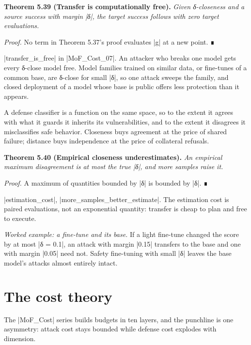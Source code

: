 \documentclass{memoir}
\begin{document}
\textbf{Theorem 5.39 (Transfer is computationally free).} \emph{Given δ-closeness and a source
success with margin \LeanVerb|δ|, the target success follows with zero target
evaluations.}

\emph{Proof.} No term in Theorem 5.37's proof evaluates \LeanVerb|g| at a new point. ∎

\LeanVerb|transfer_is_free| in \LeanVerb|MoF_Cost_07|. An attacker who breaks one model gets every
δ-close model free. Model families trained on similar data, or fine-tunes of a
common base, are δ-close for small \LeanVerb|δ|, so one attack sweeps the family, and
closed deployment of a model whose base is public offers less protection than it
appears.

A defense classifier is a function on the same space, so to the extent it agrees
with what it guards it inherits its vulnerabilities, and to the extent it
disagrees it misclassifies safe behavior. Closeness buys agreement at the price
of shared failure; distance buys independence at the price of collateral
refusals.

\textbf{Theorem 5.40 (Empirical closeness underestimates).} \emph{An empirical maximum disagreement
is at most the true \LeanVerb|δ|, and more samples raise it.}

\emph{Proof.} A maximum of quantities bounded by \LeanVerb|δ| is bounded by \LeanVerb|δ|. ∎

\LeanVerb|estimation_cost|, \LeanVerb|more_samples_better_estimate|. The estimation cost is paired
evaluations, not an exponential quantity: transfer is cheap to plan and free to
execute.

\emph{Worked example: a fine-tune and its base.} If a light fine-tune changed the
score by at most \LeanVerb|δ = 0.1|, an attack with margin \LeanVerb|0.15| transfers to the base
and one with margin \LeanVerb|0.05| need not. Safety fine-tuning with small \LeanVerb|δ| leaves
the base model's attacks almost entirely intact.



\section{The cost theory}\label{Two--Schemas--of--Impossibility-005F-005F-005F--Machine--Checked--Limits--of--Trustworthy--Machine--Learning-005F-005F-005F--and--Why--They--Tighten--with--Capability----The--Geometry--of--Attacks----The--cost--theory}

The \LeanVerb|MoF_Cost| series builds budgets in ten layers, and the punchline is one
asymmetry: attack cost stays bounded while defense cost explodes with dimension.
\end{document}
